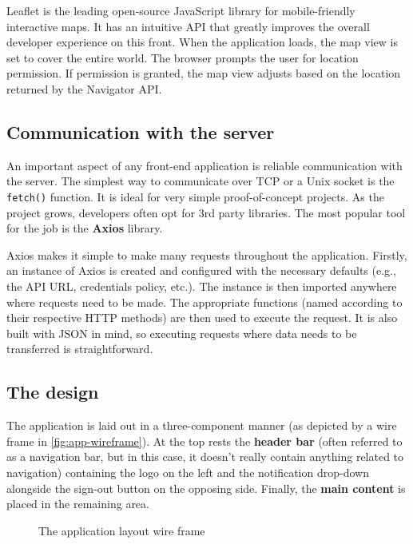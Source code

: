 \documentclass[FM,BP,EN,fonts]{tulthesis}
\begin{document}
Leaflet is the leading open-source JavaScript library for mobile-friendly interactive maps. It has an intuitive API that greatly improves the overall developer experience on this front. When the application loads, the map view is set to cover the entire world. The browser prompts the user for location permission. If permission is granted, the map view adjusts based on the location returned by the Navigator API.


\subsection{Communication with the server}
An important aspect of any front-end application is reliable communication with the server. The simplest way to communicate over TCP or a Unix socket is the \verb|fetch()| function. It is ideal for very simple proof-of-concept projects. As the project grows, developers often opt for 3rd party libraries. The most popular tool for the job is the \textbf{Axios} library. 

Axios makes it simple to make many requests throughout the application. Firstly, an instance of Axios is created and configured with the necessary defaults (e.g., the API URL, credentials policy, etc.). The instance is then imported anywhere where requests need to be made. The appropriate functions (named according to their respective HTTP methods) are then used to execute the request. It is also built with JSON in mind, so executing requests where data needs to be transferred is straightforward.


\subsection{The design}
The application is laid out in a three-component manner (as depicted by a wire frame in \autoref{fig:app-wireframe}). At the top rests the \textbf{header bar} (often referred to as a navigation bar, but in this case, it doesn't really contain anything related to navigation) containing the logo on the left and the notification drop-down alongside the sign-out button on the opposing side.  Finally, the \textbf{main content} is placed in the remaining area.

\begin{figure}[h]
    \centering
    \caption{The application layout wire frame}
    \label{fig:app-wireframe}
\end{figure}
\end{document}
